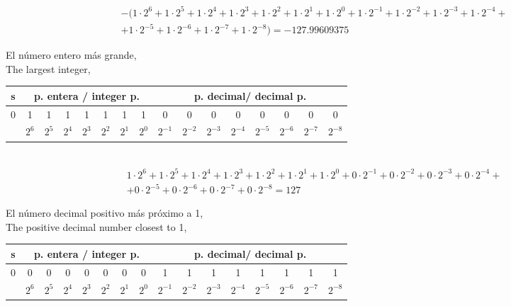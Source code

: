 \begin{equation*}
\begin{split}
&-(1\cdot 2^6+1 \cdot 2^5+ 1\cdot 2^4+ 1 \cdot 2^3+ 1 \cdot 2^2 + 1 \cdot 2^1 + 1 \cdot 2^0 + 1 \cdot 2^{-1}+ 1 \cdot 2^{-2}+ 1 \cdot 2^{-3}+ 1 \cdot 2^{-4}+\\
&+ 1 \cdot 2^{-5}+1 \cdot 2^{-6} +1 \cdot 2^{-7}+ 1\cdot 2^{-8}) =  -127.99609375
\end{split}
\end{equation*}

\begin{paracol}{2}
El número entero más grande,\\
\switchcolumn
The largest integer,
\end{paracol}

\begin{tabular}{|c||c|c|c|c|c|c|c||c|c|c|c|c|c|c|c|}
\hline
s&\multicolumn{7}{c||}{p. entera / integer p.}&\multicolumn{8}{c|}{p. decimal/ decimal p.}\\
\hline
0&1&1&1&1&1&1&1&0&0&0&0&0&0&0&0\\
\hline
&$2^{6}$&$2^{5}$&$2^{4}$&$2^{3}$&$2^{2}$&$2^{1}$&$2^{0}$&$2^{-1}$&$2^{-2}$&$2^{-3}$&$2^{-4}$&$2^{-5}$&$2^{-6}$&$2^{-7}$&$2^{-8}$\\
\hline
\end{tabular}\\

\begin{equation*}
\begin{split}
&1\cdot 2^6+1 \cdot 2^5+ 1\cdot 2^4+ 1 \cdot 2^3+ 1 \cdot 2^2 + 1 \cdot 2^1 + 1 \cdot 2^0 + 0 \cdot 2^{-1}+ 0 \cdot 2^{-2}+ 0 \cdot 2^{-3}+ 0 \cdot 2^{-4}+\\
&+ 0 \cdot 2^{-5}+0 \cdot 2^{-6} +0 \cdot 2^{-7}+0\cdot 2^{-8} =  127
\end{split}
\end{equation*}

\begin{paracol}{2}
El número decimal positivo más próximo a 1,\\
\switchcolumn
The positive decimal number closest to 1,\\
\end{paracol}

\begin{tabular}{|c||c|c|c|c|c|c|c||c|c|c|c|c|c|c|c|}
\hline
s&\multicolumn{7}{c||}{p. entera / integer p.}&\multicolumn{8}{c|}{p. decimal/ decimal p.}\\
\hline
0&0&0&0&0&0&0&0&1&1&1&1&1&1&1&1\\
\hline
&$2^{6}$&$2^{5}$&$2^{4}$&$2^{3}$&$2^{2}$&$2^{1}$&$2^{0}$&$2^{-1}$&$2^{-2}$&$2^{-3}$&$2^{-4}$&$2^{-5}$&$2^{-6}$&$2^{-7}$&$2^{-8}$\\
\hline
\end{tabular}\\

